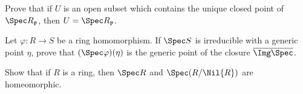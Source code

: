 \begin{problems}
\begin{problems}
		\item Prove that if $U$ is an open subset which contains the unique closed point of $\Spec R_{\mathfrak{p}}$, then $U = \Spec R_{\mathfrak{p}}$.
	\end{problems}
	
	\item Let $\varphi \colon R \to S$ be a ring homomorphism. If $\Spec S$ is irreducible with a generic point $\eta$, prove that $(\Spec\varphi)(\eta)$ is the generic point of the closure $\overline{\Img\Spec}$.
	
	\item Show that if $R$ is a ring, then $\Spec R$ and $\Spec(R/\Nil{R})$ are homeomorphic.
\end{problems}


